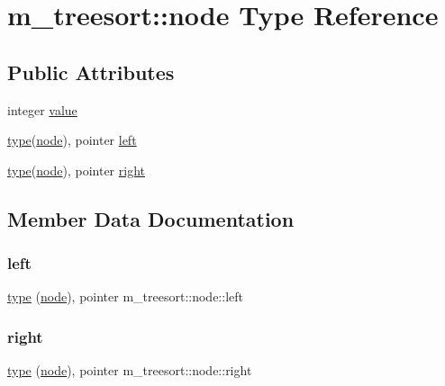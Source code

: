 \hypertarget{structm__treesort_1_1node}{}\section{m\+\_\+treesort\+:\+:node Type Reference}
\label{structm__treesort_1_1node}
\subsection*{Public Attributes}
\begin{DoxyCompactItemize}
\item 
integer \hyperlink{structm__treesort_1_1node_a8d43ab5fa2b62b0255b0510173508026}{value}
\item 
\hyperlink{stop__watch_83_8txt_a70f0ead91c32e25323c03265aa302c1c}{type}(\hyperlink{structm__treesort_1_1node}{node}), pointer \hyperlink{structm__treesort_1_1node_a2fb0da65659716ef6eff88ab8753f247}{left}
\item 
\hyperlink{stop__watch_83_8txt_a70f0ead91c32e25323c03265aa302c1c}{type}(\hyperlink{structm__treesort_1_1node}{node}), pointer \hyperlink{structm__treesort_1_1node_adfd2c4a14b54fe93048b2d54ed9ed7b6}{right}
\end{DoxyCompactItemize}


\subsection{Member Data Documentation}
\mbox{\label{structm__treesort_1_1node_a2fb0da65659716ef6eff88ab8753f247}} 
\subsubsection{\texorpdfstring{left}{left}}
{\footnotesize\ttfamily \hyperlink{stop__watch_83_8txt_a70f0ead91c32e25323c03265aa302c1c}{type} (\hyperlink{structm__treesort_1_1node}{node}), pointer m\+\_\+treesort\+::node\+::left}

\mbox{\label{structm__treesort_1_1node_adfd2c4a14b54fe93048b2d54ed9ed7b6}} 
\subsubsection{\texorpdfstring{right}{right}}
{\footnotesize\ttfamily \hyperlink{stop__watch_83_8txt_a70f0ead91c32e25323c03265aa302c1c}{type} (\hyperlink{structm__treesort_1_1node}{node}), pointer m\+\_\+treesort\+::node\+::right}

